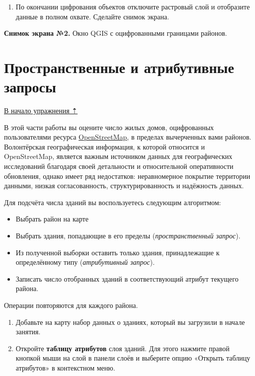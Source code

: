 \documentclass[
  12pt,
]{book}
\providecommand{\tightlist}{%
  \setlength{\itemsep}{0pt}\setlength{\parskip}{0pt}}
\begin{document}
\begin{enumerate}
\def\labelenumi{\arabic{enumi}.}
\setcounter{enumi}{17}
\tightlist
\item
  По окончании цифрования объектов отключите растровый слой и отобразите данные в полном охвате. Сделайте снимок экрана.
\end{enumerate}

\textbf{Снимок экрана №2.} Окно QGIS с оцифрованными границами районов.

\hypertarget{digitizing-query}{%
\section{Пространственные и атрибутивные запросы}\label{digitizing-query}}

\protect\hyperlink{digitizingf-districts}{В начало упражнения ⇡}

В этой части работы вы оцените число жилых домов, оцифрованных пользователями ресурса \href{https://www.openstreetmap.org/}{OpenStreetMap}, в пределах вычерченных вами районов. Волонтёрская географическая информация, к которой относится и OpenStreetMap, является важным источником данных для географических исследований благодаря своей детальности и относительной оперативности обновления, однако имеет ряд недостатков: неравномерное покрытие территории данными, низкая согласованность, структурированность и надёжность данных.

Для подсчёта числа зданий вы воспользуетесь следующим алгоритмом:

\begin{itemize}
\item
  Выбрать район на карте
\item
  Выбрать здания, попадающие в его пределы (\emph{пространственный запрос}).
\item
  Из полученной выборки оставить только здания, принадлежащие к определённому типу (\emph{атрибутивный запрос}).
\item
  Записать число отобранных зданий в соответствующий атрибут текущего района.
\end{itemize}

Операции повторяются для каждого района.

\begin{enumerate}
\def\labelenumi{\arabic{enumi}.}
\item
  Добавьте на карту набор данных о зданиях, который вы загрузили в начале занятия.
\item
  Откройте \textbf{таблицу атрибутов} слоя зданий. Для этого нажмите правой кнопкой мыши на слой в панели слоёв и выберите опцию «Открыть таблицу атрибутов» в контекстном меню.
\end{enumerate}
\end{document}
